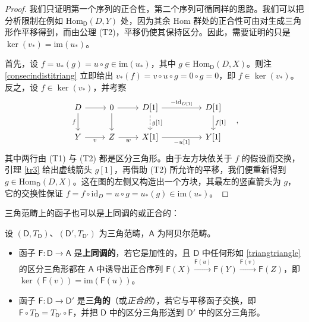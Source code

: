 \begin{proof}
	我们只证明第一个序列的正合性，第二个序列可循同样的思路。我们可以把分析限制在例如 $\text{Hom}_\mathsf{D}(D,Y)$ 处，因为其余 Hom 群处的正合性可由对生成三角形作平移得到，而由公理 (T2)，平移仍使其保持区分。因此，需要证明的只是 $\ker(v_*)=\text{im}(u_*)$。
	
	首先，设 $f=u_*(g)=u\circ g\in\text{im}(u_*)$，其中 $g\in\text{Hom}_\mathsf{D}(D,X)$。则注 \ref{consecindistitriang} 立即给出 $v_*(f)=v\circ u\circ g=0\circ g=0$，即 $f\in\ker(v_*)$。反之，设 $f\in\ker(v_*)$，并考察
	\[
	\begin{tikzcd}
		D\arrow[r]\arrow[d,"f"'] & 0 \arrow[r]\arrow[d] & D[1] \arrow[rr, "-\text{id}_{D[1]}"]\arrow[d, dashed, "{g[1]}"] & & D[1]\arrow[d, "{f[1]}"] \\
		Y\arrow[r, "v"'] & Z\arrow[r, "w"'] & X[1]\arrow[rr, "{-u[1]}"'] & & Y[1]
	\end{tikzcd}\quad,
	\]
	其中两行由 (T1) 与 (T2) 都是区分三角形。由于左方块依关于 $f$ 的假设而交换，引理 \ref{tr3} 给出虚线箭头 $g[1]$，再借助 (T2) 所允许的平移，我们便重新得到 $g\in\text{Hom}_\mathsf{D}(D,X)$。这在图的左侧又构造出一个方块，其最左的竖直箭头为 $g$，它的交换性保证 $f=f\circ\text{id}_D=u\circ g=u_*(g)\in\text{im}(u_*)$。
\end{proof}

三角范畴上的函子也可以是上同调的或正合的：

\begin{Def}\label{cohomfuncontriangulated}
	设 $(\mathsf{D}, T_\mathsf{D})$、$(\mathsf{D}', T_{\mathsf{D}'})$ 为三角范畴，$\mathsf{A}$ 为阿贝尔范畴。
	\begin{itemize}[leftmargin=0.5cm]
		\item 函子 $\mathsf{F}:\mathsf{D}\rightarrow\mathsf{A}$ 是\textbf{上同调的}，若它是加性的，且 $\mathsf{D}$ 中任何形如 \eqref{triangtriangle} 的区分三角形都在 $\mathsf{A}$ 中诱导出正合序列 $\mathsf{F}(X)\xrightarrow{\mathsf{F}(u)}\mathsf{F}(Y)\xrightarrow{\mathsf{F}(v)}\mathsf{F}(Z)$，即 $\ker({\mathsf{F}(v)})=\text{im}(\mathsf{F}(u))$。
		
		\item 函子 $\mathsf{F}:\mathsf{D}\rightarrow\mathsf{D}'$ 是\textbf{三角的}（或\textit{正合的}），若它与平移函子交换，即 $\mathsf{F}\circ T_\mathsf{D}=T_{\mathsf{D}'}\circ\mathsf{F}$，并把 $\mathsf{D}$ 中的区分三角形送到 $\mathsf{D}'$ 中的区分三角形。
	\end{itemize}
	
\end{Def}

